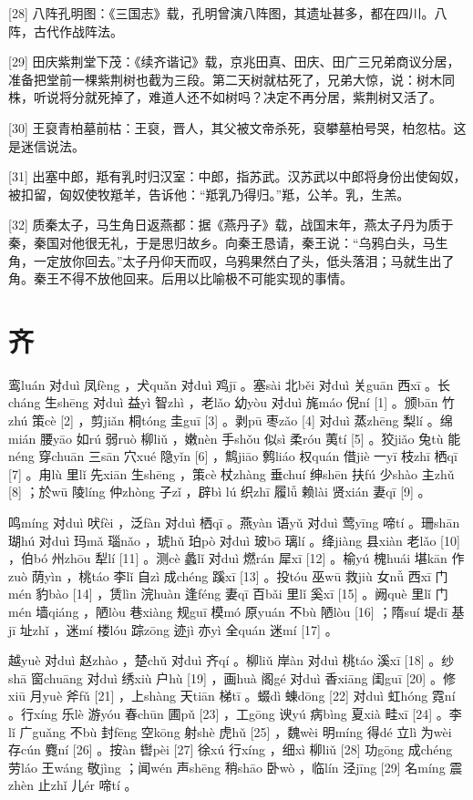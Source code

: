\documentclass[12pt,UTF8]{ctexbook}
\begin{document}
[28] 八阵孔明图：《三国志》载，孔明曾演八阵图，其遗址甚多，都在四川。八阵，古代作战阵法。

[29] 田庆紫荆堂下茂：《续齐谐记》载，京兆田真、田庆、田广三兄弟商议分居，准备把堂前一棵紫荆树也截为三段。第二天树就枯死了，兄弟大惊，说：树木同株，听说将分就死掉了，难道人还不如树吗？决定不再分居，紫荆树又活了。

[30] 王裒青柏墓前枯：王裒，晋人，其父被文帝杀死，裒攀墓柏号哭，柏忽枯。这是迷信说法。

[31] 出塞中郎，羝有乳时归汉室：中郎，指苏武。汉苏武以中郎将身份出使匈奴，被扣留，匈奴使牧羝羊，告诉他：“羝乳乃得归。”羝，公羊。乳，生羔。

[32] 质秦太子，马生角日返燕都：据《燕丹子》载，战国末年，燕太子丹为质于秦，秦国对他很无礼，于是思归故乡。向秦王恳请，秦王说：“乌鸦白头，马生角，一定放你回去。”太子丹仰天而叹，乌鸦果然白了头，低头落泪；马就生出了角。秦王不得不放他回来。后用以比喻极不可能实现的事情。





\chapter{齐}


鸾luán 对duì 凤fèng ，犬quǎn 对duì 鸡jī 。塞sài 北běi 对duì 关guān 西xī 。长cháng 生shēng 对duì 益yì 智zhì ，老lǎo 幼yòu 对duì 旄máo 倪ní [1] 。颁bān 竹zhú 策cè [2] ，剪jiǎn 桐tóng 圭guī [3] 。剥pū 枣zǎo [4] 对duì 蒸zhēng 梨lí 。绵mián 腰yāo 如rú 弱ruò 柳liǔ ，嫩nèn 手shǒu 似sì 柔róu 荑tí [5] 。狡jiǎo 兔tù 能néng 穿chuān 三sān 穴xué 隐yǐn [6] ，鹪jiāo 鹩liáo 权quán 借jiè 一yī 枝zhī 栖qī [7] 。甪lù 里lǐ 先xiān 生shēng ，策cè 杖zhàng 垂chuí 绅shēn 扶fú 少shào 主zhǔ [8] ；於wū 陵líng 仲zhòng 子zǐ ，辟bì lú 织zhī 履lǚ 赖lài 贤xián 妻qī [9] 。

鸣míng 对duì 吠fèi ，泛fàn 对duì 栖qī 。燕yàn 语yǔ 对duì 莺yīng 啼tí 。珊shān 瑚hú 对duì 玛mǎ 瑙nǎo ，琥hǔ 珀pò 对duì 玻bō 璃lí 。绛jiàng 县xiàn 老lǎo [10] ，伯bó 州zhōu 犁lí [11] 。测cè 蠡lǐ 对duì 燃rán 犀xī [12] 。榆yú 槐huái 堪kān 作zuò 荫yìn ，桃táo 李lǐ 自zì 成chéng 蹊xī [13] 。投tóu 巫wū 救jiù 女nǚ 西xī 门mén 豹bào [14] ，赁lìn 浣huàn 逢féng 妻qī 百bǎi 里lǐ 奚xī [15] 。阙què 里lǐ 门mén 墙qiáng ，陋lòu 巷xiàng 规guī 模mó 原yuán 不bù 陋lòu [16] ；隋suí 堤dī 基jī 址zhǐ ，迷mí 楼lóu 踪zōng 迹jì 亦yì 全quán 迷mí [17] 。

越yuè 对duì 赵zhào ，楚chǔ 对duì 齐qí 。柳liǔ 岸àn 对duì 桃táo 溪xī [18] 。纱shā 窗chuāng 对duì 绣xiù 户hù [19] ，画huà 阁gé 对duì 香xiāng 闺guī [20] 。修xiū 月yuè 斧fǔ [21] ，上shàng 天tiān 梯tī 。蝃dì 蝀dōng [22] 对duì 虹hóng 霓ní 。行xíng 乐lè 游yóu 春chūn 圃pǔ [23] ，工gōng 谀yú 病bìng 夏xià 畦xī [24] 。李lǐ 广guǎng 不bù 封fēng 空kōng 射shè 虎hǔ [25] ，魏wèi 明míng 得dé 立lì 为wèi 存cún 麑ní [26] 。按àn 辔pèi [27] 徐xú 行xíng ，细xì 柳liǔ [28] 功gōng 成chéng 劳láo 王wáng 敬jìng ；闻wén 声shēng 稍shāo 卧wò ，临lín 泾jīng [29] 名míng 震zhèn 止zhǐ 儿ér 啼tí 。
\end{document}
